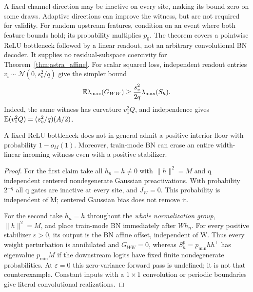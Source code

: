 \begin{remark}
A fixed channel direction may be inactive on every site, making its
bound zero on some draws. Adaptive directions can improve the witness,
but are not required for validity. For random upstream features, condition
on an event where both feature bounds hold; its probability multiplies
$p_0$. The theorem covers a pointwise ReLU bottleneck followed by a
linear readout, not an arbitrary convolutional BN decoder. It supplies
no residual-subspace coercivity for Theorem~\ref{thm:astra_affine}.
For scalar squared loss, independent readout entries
$v_i\sim\mathcal N(0,s_v^2/q)$ give the simpler bound
\[
 \mathbb{E}\lambda_{\max}(G_{WW})\ge\frac{s_v^2}{2q}\lambda_{\max}(S_h).
\]
Indeed, the same witness has curvature $v_1^2Q$, and independence gives
$\mathbb{E}(v_1^2Q)=(s_v^2/q)(A/2)$.
\end{remark}

\begin{proposition}
\label{prop:astra_bottleneck_counter}
A fixed ReLU bottleneck does not in general admit a positive interior
floor with probability $1-o_M(1)$. Moreover, train-mode BN can erase
an entire width-linear incoming witness even with a positive stabilizer.
\end{proposition}
\begin{proof}
For the first claim take all $h_n=h\ne0$ with $\|h\|^2=M$ and q
independent centered nondegenerate Gaussian preactivations. With
probability $2^{-q}$ all q gates are inactive at every site, and
$J_W=0$. This probability is independent of M; centered Gaussian bias
does not remove it.

For the second take $h_n=h$ throughout the \emph{whole normalization
group}, $\|h\|^2=M$, and place train-mode BN immediately after $Wh_n$.
For every positive stabilizer $\varepsilon>0$, its output is the BN
affine offset, independent of W. Thus every weight perturbation is
annihilated and $G_{WW}=0$, whereas
$S_h^p=p_{\min}hh^\top$ has eigenvalue $p_{\min}M$ if the downstream
logits have fixed finite nondegenerate probabilities. At
$\varepsilon=0$ this zero-variance forward pass is undefined; it is
not that counterexample. Constant inputs with a $1\times1$ convolution
or periodic boundaries give literal convolutional realizations.
\end{proof}

